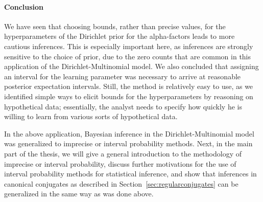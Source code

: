 \paragraph{Conclusion}

We have seen that choosing bounds, rather than precise values,
for the hyperparameters of the Dirichlet prior for the alpha-factors
leads to more cautious inferences.
This is especially important here,
as inferences are strongly sensitive to the choice of prior,
due to the zero counts that are common in this application of the Dirichlet-Multinomial model.
We also concluded that assigning an interval for the learning parameter was necessary
to arrive at reasonable posterior expectation intervals.
Still, the method is relatively easy to use, as
we identified simple ways to elicit bounds for the hyperparameters
by reasoning on hypothetical data;
essentially, the analyst needs to specify how quickly he is willing to learn
from various sorts of hypothetical data.

\medskip

In the above application, Bayesian inference in the Dirichlet-Multinomial model
was generalized to imprecise or interval probability methods.
Next, in the main part of the thesis,
we will give a general introduction to the methodology of imprecise or interval probability,
discuss further motivations for the use of interval probability methods for statistical inference,
and show that inferences in canonical conjugates as described in Section~\ref{sec:regularconjugates}
can be generalized in the same way as was done above.